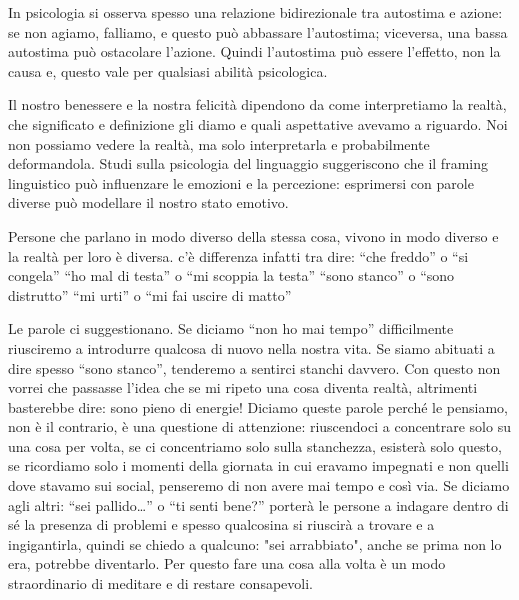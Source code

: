 \documentclass[12pt]{book} %
\begin{document}
In psicologia si osserva spesso una relazione bidirezionale tra autostima e azione: se non agiamo, falliamo, e questo può abbassare l’autostima; viceversa, una bassa autostima può ostacolare l’azione. Quindi l'autostima può essere l'effetto, non la causa e, questo vale per qualsiasi abilità psicologica.

Il nostro benessere e la nostra felicità dipendono da come interpretiamo la realtà, che significato e definizione gli
diamo e quali aspettative avevamo a riguardo. Noi non possiamo vedere la realtà, ma solo interpretarla e probabilmente deformandola. Studi sulla psicologia del linguaggio suggeriscono che il framing linguistico può influenzare le emozioni e la percezione: esprimersi con parole diverse può modellare il nostro stato emotivo.

Persone che parlano in modo diverso della stessa cosa, vivono in modo diverso e la realtà per loro è diversa. c'è
differenza infatti tra dire:\newline
“che freddo” o “si congela”\newline
“ho mal di testa” o “mi scoppia la testa”\newline
“sono stanco” o “sono distrutto”\newline
“mi urti” o “mi fai uscire di matto”

Le parole ci suggestionano. Se diciamo “non ho mai tempo” difficilmente riusciremo a introdurre qualcosa di nuovo nella nostra vita.
Se siamo abituati a dire spesso “sono stanco”, tenderemo a sentirci stanchi davvero. Con questo non vorrei che passasse l'idea che se mi ripeto una cosa diventa realtà, altrimenti basterebbe dire: sono pieno di energie! Diciamo queste parole perché le pensiamo, non è il contrario, è una questione di attenzione: riuscendoci a concentrare solo su una cosa per volta, se ci concentriamo solo sulla stanchezza, esisterà solo questo, se ricordiamo solo i momenti della giornata in cui eravamo impegnati e non quelli dove stavamo sui social, penseremo di non avere mai tempo e così via. Se diciamo agli altri: “sei pallido…” o “ti senti bene?” porterà le persone a indagare dentro di sé la presenza di problemi e spesso qualcosina si riuscirà a trovare e a ingigantirla, quindi se chiedo a qualcuno: "sei arrabbiato", anche se prima non lo era, potrebbe diventarlo. Per questo fare una cosa alla volta è un modo straordinario di meditare e di restare consapevoli.
\end{document}
